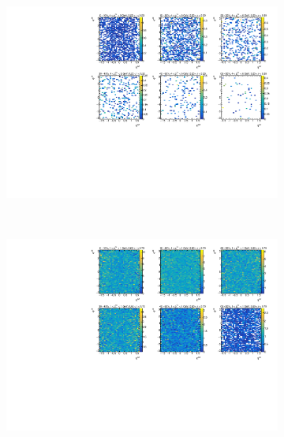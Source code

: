 \begin{figure}
\begin{subfigure}{.5\textwidth}
\caption{}
\end{subfigure}
\begin{subfigure}{.5\textwidth}
\centering \includegraphics[width=1\textwidth]{figures/main/UE/eta_phi_map_trk6_dR5}
\caption{}
\end{subfigure} \\
\begin{subfigure}{.5\textwidth}
\centering \includegraphics[width=1\textwidth]{figures/main/UE/eta_phi_map_trk2_dR9}
\caption{}
\end{subfigure}
\begin{subfigure}{.5\textwidth}

\end{subfigure}
\end{figure}
